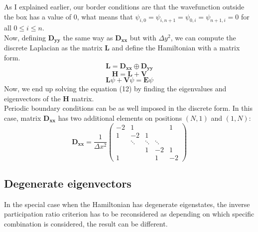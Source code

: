 \documentclass[aps,prl,reprint,onecolumn,superscriptaddress,floatfix,longbibliography]{revtex4-2}
\begin{document}
As I explained earlier, our border conditions are that the wavefunction outside the box has a value of 0, what means that $\psi_{i,0} = \psi_{i,n + 1} = \psi_{0,i} =  \psi_{n + 1,i} = 0$ for all $0 \leq i \leq n$.\\
Now, defining $\mathbf{D_{yy}}$ the same way as $\mathbf{D_{xx}}$ but with ${\Delta y^{2}}$, we can compute the discrete Laplacian as the matrix $\mathbf{L}$ and define the Hamiltonian with a matrix form.
\begin{equation}
\mathbf{L} = \mathbf{D_{xx}} \oplus \mathbf{D_{yy}}
\end{equation}
\begin{equation}
    \mathbf {H} = \mathbf{L} + \mathbf{V}
\end{equation} 
\begin{equation}
\mathbf{L}\psi + \mathbf {V}\psi = \mathbf {E}\psi
\end{equation} 
Now, we end up solving the equation (12) by finding the eigenvalues and eigenvectors of the $\mathbf{H}$ matrix.\\
Periodic boundary conditions can be as well imposed in the discrete form. In this case, matrix $\mathbf{D_{xx}}$ has two additional elements on positions $(N,1)$ and $(1,N)$:
\begin{equation}
\mathbf{D_{xx}} = \frac{1}{\Delta x^{2}}
\begin{pmatrix} 
-2 & 1 & & & 1 \\
1 & -2 & 1 & & \\
& \ddots & \ddots & \ddots &  \\
& & 1 & -2 & 1 \\
1 & & & 1 & -2
\end{pmatrix}
\end{equation}

\subsection{Degenerate eigenvectors}

In the special case when the Hamiltonian has degenerate eigenstates, the inverse participation ratio criterion has to be reconsidered as depending on which specific combination is considered, the result can be different.
\end{document}
